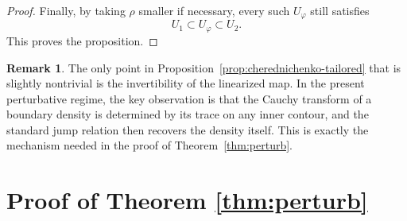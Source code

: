 \documentclass[a4paper,11pt,reqno]{amsart}
\numberwithin{equation}{section}
\theoremstyle{plain} %
\theoremstyle{definition} %
\newtheorem{remark}{Remark}[section]
\theoremstyle{remark}
\begin{document}
\begin{proof}
Finally, by taking \(\rho\) smaller if necessary, every such \(U_\varphi\) still
satisfies
\[
U_1\subset U_\varphi\subset U_2.
\]
This proves the proposition.
\end{proof}

\begin{remark}
The only point in Proposition~\ref{prop:cherednichenko-tailored} that is slightly
nontrivial is the invertibility of the linearized map. In the present perturbative
regime, the key observation is that the Cauchy transform of a boundary density is
determined by its trace on any inner contour, and the standard jump relation then
recovers the density itself. This is exactly the mechanism needed in the proof of
Theorem~\ref{thm:perturb}.
\end{remark}

\section{Proof of Theorem \ref{thm:perturb}} 
\end{document}
